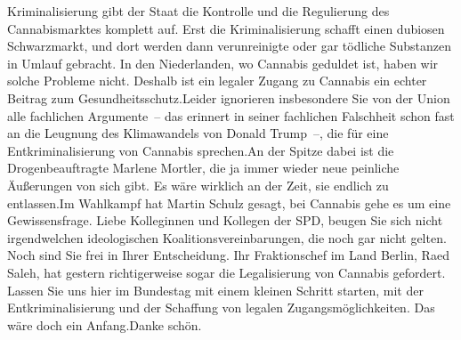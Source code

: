 \documentclass{article}
\begin{document}
Kriminalisierung gibt der Staat die Kontrolle und die Regulierung des Cannabismarktes komplett auf. Erst die Kriminalisierung schafft einen dubiosen Schwarzmarkt, und dort werden dann verunreinigte oder gar tödliche Substanzen in Umlauf gebracht. In den Niederlanden, wo Cannabis geduldet ist, haben wir solche Probleme nicht. Deshalb ist ein legaler Zugang zu Cannabis ein echter Beitrag zum Gesundheitsschutz.Leider ignorieren insbesondere Sie von der Union alle fachlichen Argumente – das erinnert in seiner fachlichen Falschheit schon fast an die Leugnung des Klimawandels von Donald Trump –, die für eine Entkriminalisierung von Cannabis sprechen.An der Spitze dabei ist die Drogenbeauftragte Marlene Mortler, die ja immer wieder neue peinliche Äußerungen von sich gibt. Es wäre wirklich an der Zeit, sie endlich zu entlassen.Im Wahlkampf hat Martin Schulz gesagt, bei Cannabis gehe es um eine Gewissensfrage. Liebe Kolleginnen und Kollegen der SPD, beugen Sie sich nicht irgendwelchen ideologischen Koalitionsvereinbarungen, die noch gar nicht gelten. Noch sind Sie frei in Ihrer Entscheidung. Ihr Fraktionschef im Land Berlin, Raed Saleh, hat gestern richtigerweise sogar die Legalisierung von Cannabis gefordert. Lassen Sie uns hier im Bundestag mit einem kleinen Schritt starten, mit der Entkriminalisierung und der Schaffung von legalen Zugangsmöglichkeiten. Das wäre doch ein Anfang.Danke schön.
\end{document}
